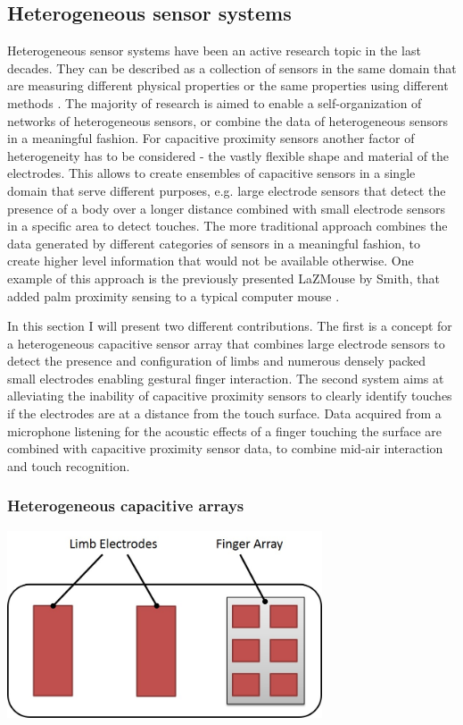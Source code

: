 \subsection{Heterogeneous sensor systems}
Heterogeneous sensor systems have been an active research topic in the last decades. They can be described as a collection of sensors in the same domain that are measuring different physical properties or the same properties using different methods \cite{buczak1998self}. The majority of research is aimed to enable a self-organization of networks of heterogeneous sensors, or combine the data of heterogeneous sensors in a meaningful fashion. For capacitive proximity sensors another factor of heterogeneity has to be considered - the vastly flexible shape and material of the electrodes. This allows to create ensembles of capacitive sensors in a single domain that serve different purposes, e.g. large electrode sensors that detect the presence of a body over a longer distance combined with small electrode sensors in a specific area to detect touches. The more traditional approach combines the data generated by different categories of sensors in a meaningful fashion, to create higher level information that would not be available otherwise. One example of this approach is the previously presented LaZMouse by Smith, that added palm proximity sensing to a typical computer mouse \cite{smith1999thesis}.

In this section I will present two different contributions. The first is a concept for a heterogeneous capacitive sensor array that combines large electrode sensors to detect the presence and configuration of limbs and numerous densely packed small electrodes enabling gestural finger interaction. The second system aims at alleviating the inability of capacitive proximity sensors to clearly identify touches if the electrodes are at a distance from the touch surface. Data acquired from a microphone listening for the acoustic effects of a finger touching the surface are combined with capacitive proximity sensor data, to combine mid-air interaction and touch recognition.
\subsubsection{Heterogeneous capacitive arrays}

\begin{minipage}{\linewidth}
\centering
\includegraphics[width=0.7\textwidth]{images/proc_hetero_array}
\label{fig:proc_hetero_array}
\end{minipage}

